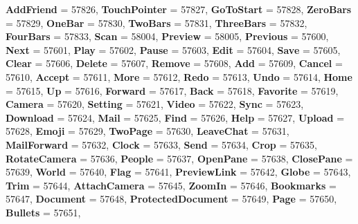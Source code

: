 \begin{DoxyCompactItemize}
{\bfseries Add\+Friend} = 57826, 
{\bfseries Touch\+Pointer} = 57827, 
\newline
{\bfseries Go\+To\+Start} = 57828, 
{\bfseries Zero\+Bars} = 57829, 
{\bfseries One\+Bar} = 57830, 
{\bfseries Two\+Bars} = 57831, 
\newline
{\bfseries Three\+Bars} = 57832, 
{\bfseries Four\+Bars} = 57833, 
{\bfseries Scan} = 58004, 
{\bfseries Preview} = 58005, 
\newline
{\bfseries Previous} = 57600, 
{\bfseries Next} = 57601, 
{\bfseries Play} = 57602, 
{\bfseries Pause} = 57603, 
\newline
{\bfseries Edit} = 57604, 
{\bfseries Save} = 57605, 
{\bfseries Clear} = 57606, 
{\bfseries Delete} = 57607, 
\newline
{\bfseries Remove} = 57608, 
{\bfseries Add} = 57609, 
{\bfseries Cancel} = 57610, 
{\bfseries Accept} = 57611, 
\newline
{\bfseries More} = 57612, 
{\bfseries Redo} = 57613, 
{\bfseries Undo} = 57614, 
{\bfseries Home} = 57615, 
\newline
{\bfseries Up} = 57616, 
{\bfseries Forward} = 57617, 
{\bfseries Back} = 57618, 
{\bfseries Favorite} = 57619, 
\newline
{\bfseries Camera} = 57620, 
{\bfseries Setting} = 57621, 
{\bfseries Video} = 57622, 
{\bfseries Sync} = 57623, 
\newline
{\bfseries Download} = 57624, 
{\bfseries Mail} = 57625, 
{\bfseries Find} = 57626, 
{\bfseries Help} = 57627, 
\newline
{\bfseries Upload} = 57628, 
{\bfseries Emoji} = 57629, 
{\bfseries Two\+Page} = 57630, 
{\bfseries Leave\+Chat} = 57631, 
\newline
{\bfseries Mail\+Forward} = 57632, 
{\bfseries Clock} = 57633, 
{\bfseries Send} = 57634, 
{\bfseries Crop} = 57635, 
\newline
{\bfseries Rotate\+Camera} = 57636, 
{\bfseries People} = 57637, 
{\bfseries Open\+Pane} = 57638, 
{\bfseries Close\+Pane} = 57639, 
\newline
{\bfseries World} = 57640, 
{\bfseries Flag} = 57641, 
{\bfseries Preview\+Link} = 57642, 
{\bfseries Globe} = 57643, 
\newline
{\bfseries Trim} = 57644, 
{\bfseries Attach\+Camera} = 57645, 
{\bfseries Zoom\+In} = 57646, 
{\bfseries Bookmarks} = 57647, 
\newline
{\bfseries Document} = 57648, 
{\bfseries Protected\+Document} = 57649, 
{\bfseries Page} = 57650, 
{\bfseries Bullets} = 57651, 
\newline

\end{DoxyCompactItemize}
